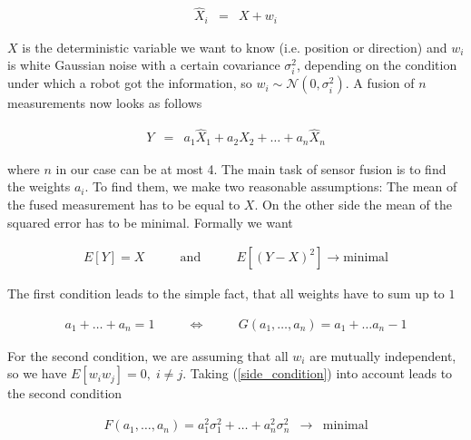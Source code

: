\begin{enumerate}
	\begin{eqnarray}\label{measurement}
    			\hat{X}_{i} &=& X + w_i
	\end{eqnarray}
\end{enumerate}

\(X\) is the deterministic variable we want to know (i.e. position or direction) and \(w_i\) is white Gaussian noise with a certain covariance \(\sigma_i^2\), depending on the condition under which a robot got the information, so \(w_i \sim \mathcal{N}(0,\sigma_i^2)\). A fusion of \(n\) measurements now looks as follows

\begin{enumerate}
	\begin{eqnarray}\label{fusion}
    			 Y &=& a_1 \hat{X}_{1} + a_2 \hat{X}_{2} + \ldots + a_n \hat{X}_{n}
	\end{eqnarray}
\end{enumerate}

where \(n\) in our case can be at most 4. The main task of sensor fusion is to find the weights \(a_i\). To find them, we make two reasonable assumptions: The mean of the fused measurement has to be equal to \(X\). On the other side the mean of the squared error has to be minimal. Formally we want

\begin{enumerate}
	\begin{eqnarray}\label{assumptions}
    			 E[Y] = X \qquad  &\mathrm{and}& \qquad E\left[ (Y-X)^2 \right] \rightarrow 						\mathrm{minimal} 
	\end{eqnarray}
\end{enumerate}

The first condition leads to the simple fact, that all weights have to sum up to \(1\)

\begin{enumerate}
	\begin{eqnarray}\label{side_condition}
    			 a_1 + \ldots + a_n = 1 \qquad &\Longleftrightarrow& \qquad G(a_1, \ldots, a_n) = a_1 +   				\ldots a_n - 1
	\end{eqnarray}
\end{enumerate}

For the second condition, we are assuming that all \(w_i\) are mutually independent, so we have \(E[w_i w_j] = 0, \; i \neq j\). Taking (\ref{side_condition}) into account leads to the second condition

\begin{enumerate}
	\begin{eqnarray}\label{main_condition}
    			 F(a_1,\ldots,a_n) = a_1^2\sigma_1^2 + \ldots + a_n^2 \sigma_n^2 &\rightarrow&  					\mathrm{minimal}
	\end{eqnarray}
\end{enumerate}

